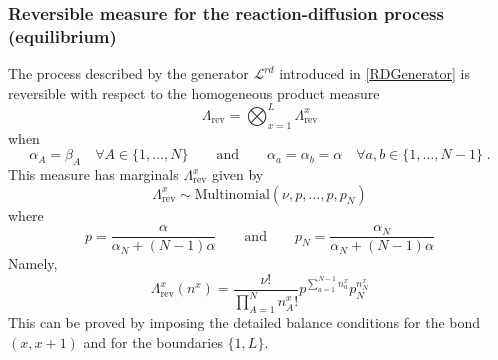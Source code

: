 \documentclass[10pt]{article}
\numberwithin{equation}{section}
\numberwithin{equation}{subsection}
\newcommand{\dt}{\;.}
\newcommand{\twoj}{\nu}
\begin{document}
\subsubsection{Reversible measure for the reaction-diffusion process (equilibrium)} 
The process described by the generator $\mathcal{L}^{rd}$ introduced in \eqref{RDGenerator} is reversible with respect to the homogeneous product measure \begin{equation}\label{reversibleMeasureRD}
	\Lambda_{\text{rev}}=\bigotimes_{x=1}^{L}\Lambda_{\text{rev}}^{x}
\end{equation}
when
\begin{equation}\label{reversibilityConditionRD}
	\alpha_{A}=\beta_{A}\quad\forall A\in\{1,\ldots,N\}\qquad \text{and}\qquad \alpha_{a}=\alpha_{b}=\alpha \quad \forall a,b\in \{1,\ldots,N-1\}\dt
\end{equation}
This measure has marginals $\Lambda_{\text{rev}}^{x}$ given by 
\begin{equation}
	\Lambda^{x}_{\text{rev}}\sim \text{Multinomial}\left(\twoj,p,\ldots,p,p_{N}\right)
\end{equation}
where 
\begin{equation}
	p=\frac{\alpha}{\alpha_{N}+(N-1)\alpha}\qquad \text{and}\qquad p_{N}=\frac{\alpha_{N}}{\alpha_{N}+(N-1)\alpha}
\end{equation}
Namely,
\begin{equation}
	\Lambda_{\text{rev}}^{x}(n^{x})=\frac{\nu!}{\prod_{A=1}^{N}n_{A}^{x}!}p^{\sum_{a=1}^{N-1}n_{a}^{x}}p_{N}^{n_{N}^{x}}
\end{equation} 
This can be proved by imposing the detailed balance conditions for the bond $(x,x+1)$ and for the boundaries $\{1,L\}$.\\
\end{document}
